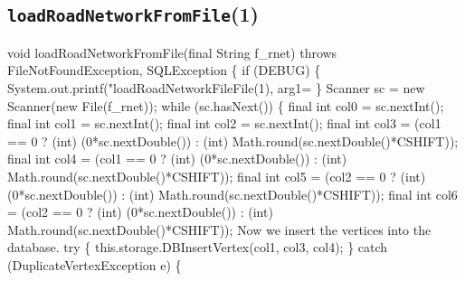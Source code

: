 \subsection{\texttt{loadRoadNetworkFromFile}(1)}
\nwenddocs{}\endmoddef{}
void loadRoadNetworkFromFile(final String f_rnet) throws FileNotFoundException, SQLException \{
  if (DEBUG) \{
    System.out.printf("loadRoadNetworkFileFile(1), arg1=%
  \}
  Scanner sc = new Scanner(new File(f_rnet));
  while (sc.hasNext()) \{
\eatline
{}\nwendcode{}
\nwenddocs{}\plusendmoddef
final int col0 = sc.nextInt();
final int col1 = sc.nextInt();
final int col2 = sc.nextInt();
final int col3 = (col1 == 0 ? (int) (0*sc.nextDouble()) : (int) Math.round(sc.nextDouble()*CSHIFT));
final int col4 = (col1 == 0 ? (int) (0*sc.nextDouble()) : (int) Math.round(sc.nextDouble()*CSHIFT));
final int col5 = (col2 == 0 ? (int) (0*sc.nextDouble()) : (int) Math.round(sc.nextDouble()*CSHIFT));
final int col6 = (col2 == 0 ? (int) (0*sc.nextDouble()) : (int) Math.round(sc.nextDouble()*CSHIFT));
\nwendcode{}\nwdocspar
{\small Now we insert the vertices into the database.}
\nwenddocs{}\plusendmoddef
try \{
  this.storage.DBInsertVertex(col1, col3, col4);
\} catch (DuplicateVertexException e) \{
